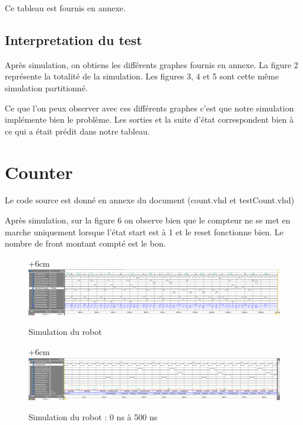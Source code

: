 \documentclass{article}
\begin{document}
Ce tableau est fournis en annexe. 
\subsection{Interpretation du test}

Après simulation, on obtiens les différents graphes fournis en annexe. La figure 2 représente la totalité de la simulation. Les figures 3, 4 et 5 sont cette même simulation partitionné. 

Ce que l'on peux observer avec ces différents graphes c'est que notre simulation implémente bien le problème. Les sorties  et la suite d'état correspondent bien à ce qui a était prédit dans notre tableau.

\section{Counter}
Le code source est donné en annexe du document (count.vhd et testCount.vhd)

Après simulation, sur la figure 6 on observe bien que le compteur ne se met en marche uniquement lorsque l'état start est à 1 et le reset fonctionne bien. Le nombre de front montant compté est le bon.











\begin{figure}[h]
\advance\leftskip+6cm
\includegraphics[scale=0.50, angle=-90]{TestRobotMain.PNG}
\caption{Simulation du robot}
\end{figure}

\begin{figure}[h]
\advance\leftskip+6cm
\includegraphics[scale=0.50, angle=-90]{detail_part1.PNG}
\caption{Simulation du robot : 0 ns à 500 ns}
\end{figure}
\end{document}
